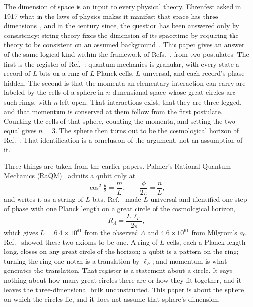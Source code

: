 \documentclass[aps,prd,twocolumn,superscriptaddress,nofootinbib]{revtex4-2}
\begin{document}
The dimension of space is an input to every physical theory. Ehrenfest asked in 1917 what in the laws of physics makes it manifest that space has three dimensions~\cite{ehrenfest1917}, and in the century since, the question has been answered only by consistency: string theory fixes the dimension of its spacetime by requiring the theory to be consistent on an assumed background~\cite{lovelace1971,goddard1972}. This paper gives an answer of the same logical kind within the framework of Refs.~\cite{korytko2026,korytko2026b,korytko2026c}, from two postulates. The first is the register of Ref.~\cite{korytko2026c}: quantum mechanics is granular, with every state a record of $L$ bits on a ring of $L$ Planck cells, $L$ universal, and each record's phase hidden. The second is that the momenta an elementary interaction can carry are labeled by the cells of a sphere in $n$-dimensional space whose great circles are such rings, with $n$ left open. That interactions exist, that they are three-legged, and that momentum is conserved at them follow from the first postulate. Counting the cells of that sphere, counting the momenta, and setting the two equal gives $n = 3$. The sphere then turns out to be the cosmological horizon of Ref.~\cite{korytko2026}. That identification is a conclusion of the argument, not an assumption of it.

Three things are taken from the earlier papers. Palmer's Rational Quantum Mechanics (RaQM)~\cite{palmer2020,palmer2026,palmer2026b,palmer2026c} admits a qubit only at
\begin{equation}
\cos^2\tfrac{\theta}{2} = \frac{m}{L},\qquad \frac{\phi}{2\pi} = \frac{n}{L},
\label{eq:raqm}
\end{equation}
and writes it as a string of $L$ bits. Ref.~\cite{korytko2026} made $L$ universal and identified one step of phase with one Planck length on a great circle of the cosmological horizon,
\begin{equation}
R_\Lambda = \frac{L\,\ell_P}{2\pi},
\label{eq:ident}
\end{equation}
which gives $L = 6.4\times10^{61}$ from the observed $\Lambda$ and $4.6\times10^{61}$ from Milgrom's $a_0$. Ref.~\cite{korytko2026c} showed these two axioms to be one. A ring of $L$ cells, each a Planck length long, closes on any great circle of the horizon; a qubit is a pattern on the ring; turning the ring one notch is a translation by $\ell_P$; and momentum is what generates the translation. That register is a statement about a circle. It says nothing about how many great circles there are or how they fit together, and it leaves the three-dimensional bulk unconstructed. This paper is about the sphere on which the circles lie, and it does not assume that sphere's dimension.
\end{document}
